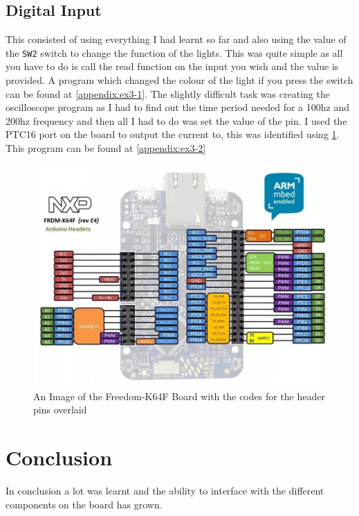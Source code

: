 \documentclass[a4paper,12pt]{scrartcl}
\begin{document}
{		\subsection{Digital Input}
		{
			This consisted of using everything I had learnt so far and also using the value of the \lstinline|SW2| switch to change the function of the lights. This was quite simple as all you have to do is call the read function on the input you wish and the value is provided. A program which changed the colour of the light if you press the switch can be found at \cref{appendix:ex3-1}. The slightly difficult task was creating the oscilloscope program as I had to find out the time period needed for a 100hz and 200hz frequency and then all I had to do was set the value of the pin. I used the PTC16 port on the board to output the current to, this was identified using \cref{img:FRDM-K64F-HEADERPINS}. This program can be found at \cref{appendix:ex3-2}
			\begin{figure}
				\centering
				\includegraphics[width=\textwidth]{frdm_k64f_reve4_header_pinout}
				\caption{An Image of the Freedom-K64F Board with the codes for the header pins overlaid\cite{armlimited2015}}
				\label{img:FRDM-K64F-HEADERPINS}
			\end{figure}
		}
	}

	\section{Conclusion}
	{
		In conclusion a lot was learnt and the ability to interface with the different components on the board has grown.
	}
	
	\newpage
	
	\printbibliography[heading=bibintoc,title=References]
\end{document}
